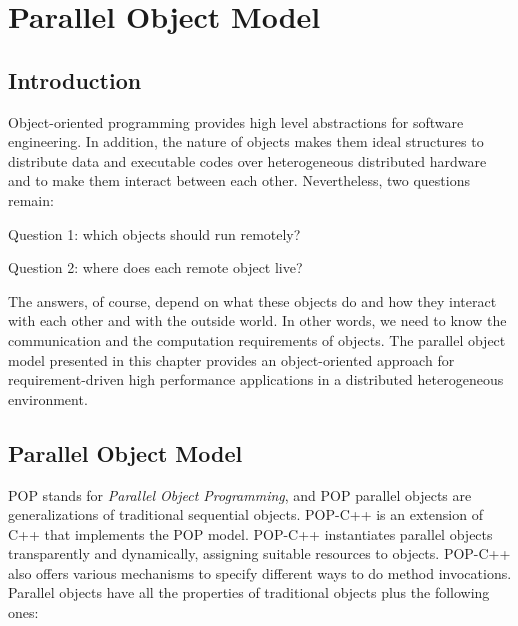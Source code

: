 \chapter{Parallel Object Model}\label{chap:model}


\section{Introduction}


Object-oriented programming provides high level abstractions for software
engineering. In addition, the nature of objects makes them ideal
structures to distribute data and executable codes over heterogeneous
distributed hardware and to make them interact between each other.
Nevertheless, two questions remain:

\begin{petitem}

\item Question 1: which objects should run remotely?

\item Question 2: where does each remote object live?

\end{petitem}

The answers, of course, depend on what these objects do and how
they interact with each other and with the outside world. In other
words, we need to know the communication and the computation
requirements of objects. The parallel object model presented in this
chapter provides an object-oriented approach for requirement-driven high
performance applications in a distributed heterogeneous environment.



\section{Parallel Object Model}


POP stands for {\it Parallel Object Programming}, and POP parallel objects are
generalizations of traditional sequential objects. POP-C++ is an
extension of C++ that implements the POP model. POP-C++ instantiates
parallel objects transparently and dynamically, assigning suitable
resources to objects. POP-C++ also offers various mechanisms to specify
different ways to do method invocations. Parallel objects have all the properties
of traditional objects plus the following ones:


